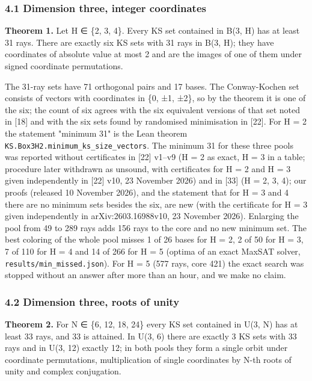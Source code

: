 \documentclass[11pt,a4paper]{article}
\begin{document}
\subsubsection{4.1 Dimension three, integer coordinates}\label{41-dimension-three-integer-coordinates}

\textbf{Theorem 1.} Let H ∈ \{2, 3, 4\}. Every KS set contained in B(3, H) has at least 31 rays. There are
exactly six KS sets with 31 rays in B(3, H); they have coordinates of absolute value at most 2 and are
the images of one of them under signed coordinate permutations.

The 31-ray sets have 71 orthogonal pairs and 17 bases. The Conway-Kochen set consists of vectors with
coordinates in \{0, ±1, ±2\}, so by the theorem it is one of the six; the count of six agrees with the
six equivalent versions of that set noted in {[}18{]} and with the six sets found by randomised
minimisation in {[}22{]}. For H = 2 the statement "minimum 31" is the Lean theorem
\texttt{KS.Box3H2.minimum\_ks\_size\_vectors}. The minimum 31 for these three pools was reported without
certificates in {[}22{]} v1--v9 (H = 2 as exact, H = 3 in a table; procedure later withdrawn as unsound, with certificates for H = 2 and H = 3 given independently in {[}22{]} v10, 23 November 2026) and in {[}33{]} (H = 2, 3, 4); our proofs (released 10 November 2026), and the
statement that for H = 3 and 4 there are no minimum sets besides the six, are new (with the certificate for H = 3 given independently in arXiv:2603.16988v10, 23 November 2026). Enlarging the pool
from 49 to 289 rays adds 156 rays to the core and no new minimum set. The best coloring of the whole
pool misses 1 of 26 bases for H = 2, 2 of 50 for H = 3, 7 of 110 for H = 4 and 14 of 266 for H = 5
(optima of an exact MaxSAT solver, \texttt{results/min\_missed.json}). For H = 5 (577 rays, core 421) the exact search was stopped without an answer after
more than an hour, and we make no claim.

\subsubsection{4.2 Dimension three, roots of unity}\label{42-dimension-three-roots-of-unity}

\textbf{Theorem 2.} For N ∈ \{6, 12, 18, 24\} every KS set contained in U(3, N) has at least 33 rays, and 33 is
attained. In U(3, 6) there are exactly 3 KS sets with 33 rays and in U(3, 12) exactly 12; in both pools
they form a single orbit under coordinate permutations, multiplication of single coordinates by N-th
roots of unity and complex conjugation.
\end{document}

